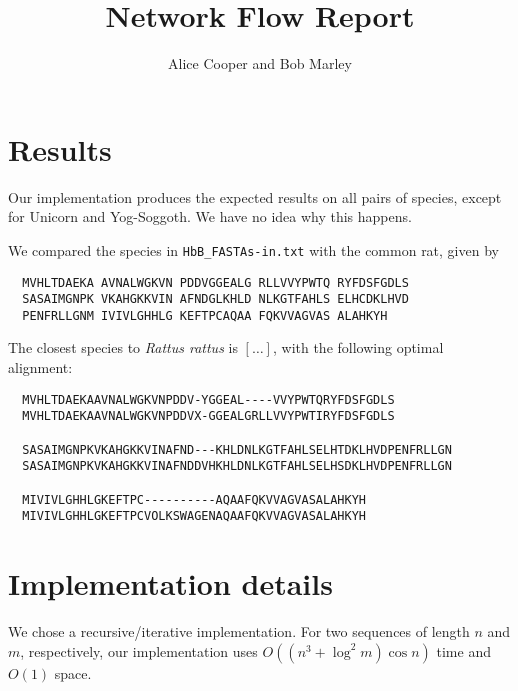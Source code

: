 \documentclass{tufte-handout}
\title{Network Flow Report}
\author{Alice Cooper and Bob Marley}
\begin{document}
  \maketitle

  \section{Results}

  Our implementation produces the expected results on all pairs of species, except for Unicorn and Yog-Soggoth.
  We have no idea why this happens.%

  We compared the species in \verb!HbB_FASTAs-in.txt!
  with the common rat, given by

  \begin{verbatim}
  MVHLTDAEKA AVNALWGKVN PDDVGGEALG RLLVVYPWTQ RYFDSFGDLS
  SASAIMGNPK VKAHGKKVIN AFNDGLKHLD NLKGTFAHLS ELHCDKLHVD
  PENFRLLGNM IVIVLGHHLG KEFTPCAQAA FQKVVAGVAS ALAHKYH
  \end{verbatim}

  The closest species to \emph{Rattus rattus} is $[\ldots]$, with the following optimal alignment:

\medskip
  \begin{fullwidth}\small
  \begin{verbatim}
  MVHLTDAEKAAVNALWGKVNPDDV-YGGEAL----VVYPWTQRYFDSFGDLS
  MVHLTDAEKAAVNALWGKVNPDDVX-GGEALGRLLVVYPWTIRYFDSFGDLS

  SASAIMGNPKVKAHGKKVINAFND---KHLDNLKGTFAHLSELHTDKLHVDPENFRLLGN
  SASAIMGNPKVKAHGKKVINAFNDDVHKHLDNLKGTFAHLSELHSDKLHVDPENFRLLGN

  MIVIVLGHHLGKEFTPC----------AQAAFQKVVAGVASALAHKYH
  MIVIVLGHHLGKEFTPCVOLKSWAGENAQAAFQKVVAGVASALAHKYH
  \end{verbatim}
\end{fullwidth}



  \section{Implementation details}

  We chose a recursive/iterative implementation.
  For two sequences of length $n$ and $m$, respectively, our implementation uses $O((n^3+\log^2 m)\cos n)$ time and
  $O(1)$ space.
\end{document}
